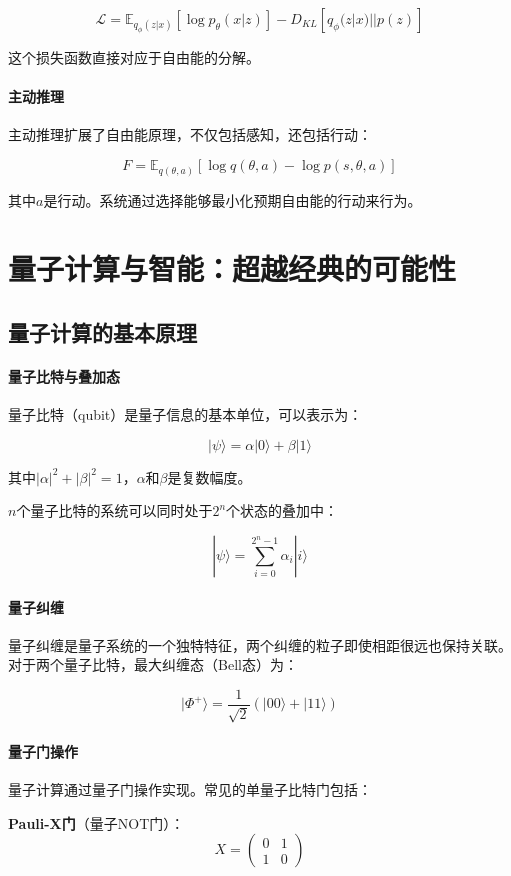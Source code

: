 $$\mathcal{L} = \mathbb{E}_{q_{\phi}(z|x)}[\log p_{\theta}(x|z)] - D_{KL}[q_{\phi}(z|x)||p(z)]$$

这个损失函数直接对应于自由能的分解。

\paragraph{主动推理}
主动推理扩展了自由能原理，不仅包括感知，还包括行动：

$$F = \mathbb{E}_{q(\theta,a)}[\log q(\theta,a) - \log p(s,\theta,a)]$$

其中$a$是行动。系统通过选择能够最小化预期自由能的行动来行为。

\section{量子计算与智能：超越经典的可能性}

\subsection{量子计算的基本原理}

\paragraph{量子比特与叠加态}
量子比特（qubit）是量子信息的基本单位，可以表示为：

$$|\psi\rangle = \alpha|0\rangle + \beta|1\rangle$$

其中$|\alpha|^2 + |\beta|^2 = 1$，$\alpha$和$\beta$是复数幅度。

$n$个量子比特的系统可以同时处于$2^n$个状态的叠加中：

$$|\psi\rangle = \sum_{i=0}^{2^n-1} \alpha_i |i\rangle$$

\paragraph{量子纠缠}
量子纠缠是量子系统的一个独特特征，两个纠缠的粒子即使相距很远也保持关联。对于两个量子比特，最大纠缠态（Bell态）为：

$$|\Phi^+\rangle = \frac{1}{\sqrt{2}}(|00\rangle + |11\rangle)$$

\paragraph{量子门操作}
量子计算通过量子门操作实现。常见的单量子比特门包括：

\textbf{Pauli-X门}（量子NOT门）：
$$X = \begin{pmatrix} 0 & 1 \\ 1 & 0 \end{pmatrix}$$

